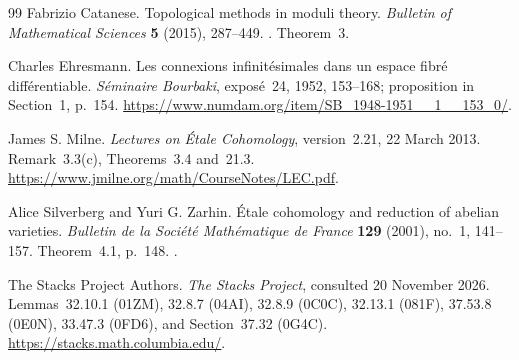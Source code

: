 \documentclass[11pt]{amsart}
\theoremstyle{definition}
\theoremstyle{remark}
\numberwithin{equation}{section}
\begin{document}
\begin{thebibliography}{99}
Fabrizio Catanese.
\newblock Topological methods in moduli theory.
\newblock \emph{Bulletin of Mathematical Sciences} \textbf{5} (2015), 287--449.
\newblock {}. Theorem~3.

Charles Ehresmann.
\newblock Les connexions infinitésimales dans un espace fibré différentiable.
\newblock \emph{Séminaire Bourbaki}, exposé~24, 1952, 153--168; proposition in Section~1, p.~154.
\newblock \url{https://www.numdam.org/item/SB_1948-1951__1__153_0/}.

James S. Milne.
\newblock \emph{Lectures on Étale Cohomology}, version~2.21, 22 March 2013.
\newblock Remark~3.3(c), Theorems~3.4 and~21.3.
\newblock \url{https://www.jmilne.org/math/CourseNotes/LEC.pdf}.

Alice Silverberg and Yuri G. Zarhin.
\newblock Étale cohomology and reduction of abelian varieties.
\newblock \emph{Bulletin de la Société Mathématique de France} \textbf{129} (2001), no.~1, 141--157. Theorem~4.1, p.~148.
\newblock {}.

The Stacks Project Authors.
\newblock \emph{The Stacks Project}, consulted 20 November 2026.
\newblock Lemmas~32.10.1 (01ZM), 32.8.7 (04AI), 32.8.9 (0C0C), 32.13.1 (081F), 37.53.8 (0E0N), 33.47.3 (0FD6), and Section~37.32 (0G4C).
\newblock \url{https://stacks.math.columbia.edu/}.

\end{thebibliography}
\end{document}

